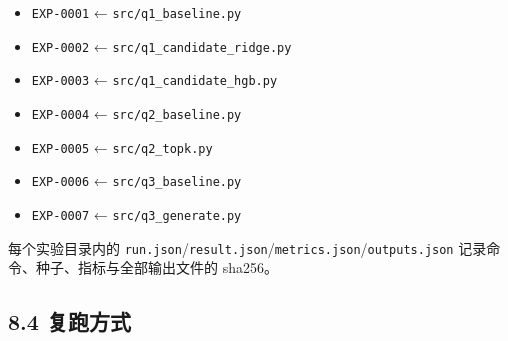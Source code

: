 \documentclass[
  11pt,
]{ctexart}
\providecommand{\tightlist}{%
  \setlength{\itemsep}{0pt}\setlength{\parskip}{0pt}}
\begin{document}
\begin{itemize}
\tightlist
\item
  \texttt{EXP-0001} ← \texttt{src/\allowbreak{}q1\_\allowbreak{}baseline.\allowbreak{}py}
\item
  \texttt{EXP-0002} ← \texttt{src/\allowbreak{}q1\_\allowbreak{}candidate\_\allowbreak{}ridge.\allowbreak{}py}
\item
  \texttt{EXP-0003} ← \texttt{src/\allowbreak{}q1\_\allowbreak{}candidate\_\allowbreak{}hgb.\allowbreak{}py}
\item
  \texttt{EXP-0004} ← \texttt{src/\allowbreak{}q2\_\allowbreak{}baseline.\allowbreak{}py}
\item
  \texttt{EXP-0005} ← \texttt{src/\allowbreak{}q2\_\allowbreak{}topk.\allowbreak{}py}
\item
  \texttt{EXP-0006} ← \texttt{src/\allowbreak{}q3\_\allowbreak{}baseline.\allowbreak{}py}
\item
  \texttt{EXP-0007} ← \texttt{src/\allowbreak{}q3\_\allowbreak{}generate.\allowbreak{}py}
\end{itemize}

每个实验目录内的
\texttt{run.json}/\texttt{result.json}/\texttt{metrics.json}/\texttt{outputs.json}
记录命令、种子、指标与全部输出文件的 sha256。

\subsection{8.4 复跑方式}\label{ux590dux8dd1ux65b9ux5f0f}
\end{document}
